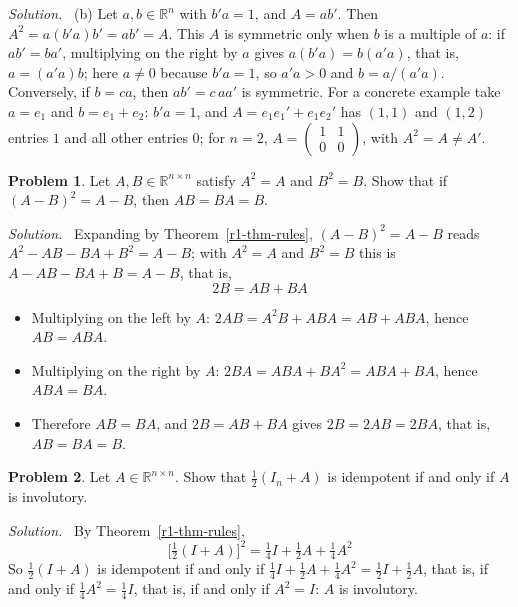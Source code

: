 \documentclass[12pt]{article}
\newcommand{\R}{\mathbb R}
\theoremstyle{definition}
\newtheorem{problem}{Problem}
\newenvironment{solution}{\par\noindent\textit{Solution.}\ }{\par\smallskip}
\begin{document}
\begin{solution}
(b) Let \(a,b\in\R^n\) with \(b'a=1\), and \(A=ab'\). Then
\(A^2=a(b'a)b'=ab'=A\). This \(A\) is symmetric only when \(b\) is a multiple of
\(a\): if \(ab'=ba'\), multiplying on the right by \(a\) gives \(a(b'a)=b(a'a)\),
that is, \(a=(a'a)b\); here \(a\ne0\) because \(b'a=1\), so \(a'a>0\) and
\(b=a/(a'a)\). Conversely, if \(b=ca\), then \(ab'=c\,aa'\) is symmetric. For a
concrete example take \(a=e_1\) and \(b=e_1+e_2\): \(b'a=1\), and \(A=e_1e_1'+e_1e_2'\)
has \((1,1)\) and \((1,2)\) entries \(1\) and all other entries \(0\); for \(n=2\),
\(A=\left(\begin{smallmatrix}1&1\\0&0\end{smallmatrix}\right)\), with \(A^2=A\ne A'\).
\end{solution}

\begin{problem}\label{r1-ex-idempotent-difference}
Let \(A,B\in\R^{n\times n}\) satisfy \(A^2=A\) and \(B^2=B\). Show that if \((A-B)^2=A-B\), then \(AB=BA=B\).
\end{problem}
\begin{solution}
Expanding by Theorem~\ref{r1-thm-rules}, \((A-B)^2=A-B\) reads \(A^2-AB-BA+B^2=A-B\); with \(A^2=A\) and \(B^2=B\)
this is \(A-AB-BA+B=A-B\), that is,
\[
2B=AB+BA
\]
\begin{itemize}
\item Multiplying on the left by \(A\): \(2AB=A^2B+ABA=AB+ABA\), hence \(AB=ABA\).
\item Multiplying on the right by \(A\): \(2BA=ABA+BA^2=ABA+BA\), hence \(ABA=BA\).
\item Therefore \(AB=BA\), and \(2B=AB+BA\) gives \(2B=2AB=2BA\), that is, \(AB=BA=B\).
\end{itemize}
\end{solution}

\begin{problem}\label{r1-ex-involutory-idempotent}
Let \(A\in\R^{n\times n}\). Show that \(\frac12(I_n+A)\) is idempotent if and only if \(A\) is involutory.
\end{problem}
\begin{solution}
By Theorem~\ref{r1-thm-rules},
\[
\bigl[\tfrac12(I+A)\bigr]^2=\tfrac14I+\tfrac12A+\tfrac14A^2
\]
So \(\frac12(I+A)\) is idempotent if and only if \(\frac14I+\frac12A+\frac14A^2=\frac12I+\frac12A\), that is, if and
only if \(\frac14A^2=\frac14I\), that is, if and only if \(A^2=I\): \(A\) is involutory.
\end{solution}
\end{document}

